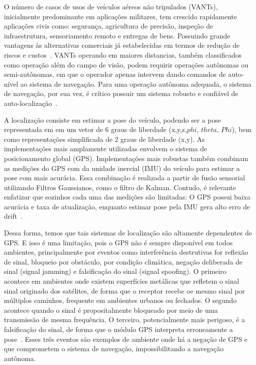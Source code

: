 O número de casos de usos de veículos aéreos não tripulados (VANTs), inicialmente predominante em aplicações militares, tem crescido rapidamente aplicações civis como: segurança, agricultura de precisão, inspeção de infraestrutura, sensoriamento remoto e entregas de bens. Possuindo grande vantagens às alternativas comerciais já estabelecidas em termos de redução de riscos e custos~\cite{8682048}. VANTs operando em maiores distancias, também classificados como operação além do campo de visão, podem requirir operações autônomas ou semi-autônomas, em que o operador apenas intervem dando comandos de auto-nível ao sistema de navegação. Para uma operação autônoma adequada, o sistema de navegação, por sua vez, é crítico possuir um sistema robusto e confiável de auto-localização~\cite{COUTURIER2021103666}.

A localização consiste em estimar a pose do veículo, podendo ser a pose representada em em um vetor de 6 graus de liberdade (x,y,z,\(phi\), \(theta\), \(Phi\)), bem como representações simplificada de 2 graus de liberdade (x,y).
As implementações mais amplamente utilizadas envolvem o sistema de posicionamento global (GPS). Implementações mais robustas também combinam as medições do GPS com da unidade inercial (IMU) do veículo para estimar a pose com mais acurácia. Essa combinação é realizada a partir de fusão sensorial utilizando Filtros Gaussianos, como o filtro de Kalman. Contudo, é relevante enfatizar que sozinhos cada uma das medições são limitadas: O GPS possui baixa acurácia e taxa de atualização, enquanto estimar pose pela IMU gera alto erro de drift~\cite{COUTURIER2021103666}.

Dessa forma, temos que tais sistemas de localização são altamente dependentes de GPS. E isso é uma limitação, pois o GPS não é sempre disponível em todos ambientes, principalmente por eventos como interferência destrutivas for reflexão de sinal, bloqueio por obstáculo, por condição climática, negação deliberada de sinal (signal jamming) e falsificação do sinal (signal spoofing).
O primeiro acontece em ambientes onde existem superfícies metálicas que refletem o sinal sinal originado dos satélites, de forma que o receptor recebe oe mesmo sinal por múltiplos caminhos, frequente em ambientes urbanos ou fechados. O segundo acontece quando o sinal é propositalmente bloqueado por meio de uma transmissão de mesma frequência. O terceiro, potencialmente mais perigoso, é a falsificação do sinal, de forma que o módulo GPS interpreta erroneamente a pose~\cite{6837385}. Esses três eventos são exemplos de ambiente onde há a negação de GPS e que comprometem o sistema de navegação, impossibilitando a navegação autônoma.

